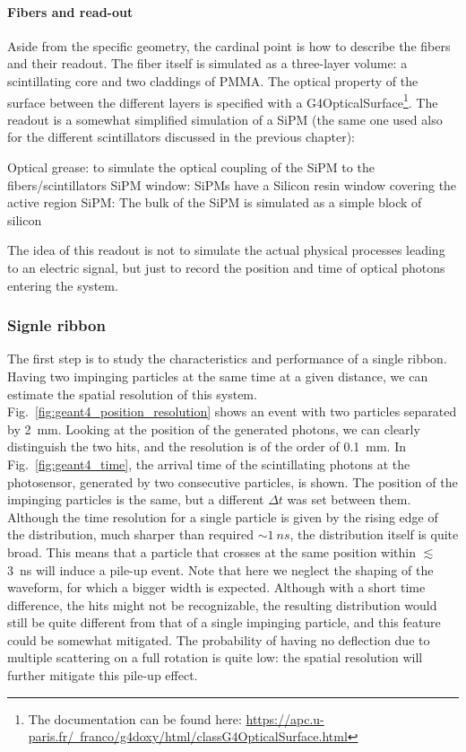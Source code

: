 \begin{refsection}
        \paragraph{Fibers and read-out} Aside from the specific geometry, the cardinal point is how to describe the fibers and their readout. 
        The fiber itself is simulated as a three-layer volume: a scintillating core and two claddings of PMMA.
        The optical property of the surface between the different layers is specified with a G4OpticalSurface\footnote{The documentation can be found here: \href{https://apc.u-paris.fr/~franco/g4doxy/html/classG4OpticalSurface.html}{https://apc.u-paris.fr/~franco/g4doxy/html/classG4OpticalSurface.html}}.
        The readout is a somewhat simplified simulation of a SiPM (the same one used also for the different scintillators discussed in the previous chapter):
        \begin{outline}
            \1 Optical grease: to simulate the optical coupling of the SiPM to the fibers/scintillators
            \1 SiPM window: SiPMs have a Silicon resin window covering the active region
            \1 SiPM: The bulk of the SiPM is simulated as a simple block of silicon
        \end{outline}
        The idea of this readout is not to simulate the actual physical processes leading to an electric signal, but just to record the position and time of optical photons entering the system.

        \subsubsection{Signle ribbon}
        The first step is to study the characteristics and performance of a single ribbon. Having two impinging particles at the same time at a given distance, we can estimate the spatial resolution of this system.  Fig.~\ref{fig:geant4_position_resolution} shows an event with two particles separated by \SI{2}{mm}. Looking at the position of the generated photons, we can clearly distinguish the two hits, and the resolution is of the order of \SI{0.1}{mm}.
        In Fig.~\ref{fig:geant4_time}, the arrival time of the scintillating photons at the photosensor, generated by two consecutive particles, is shown. 
        The position of the impinging particles is the same, but a different $\Delta t$ was set between them. 
        Although the time resolution for a single particle is given by the rising edge of the distribution, much sharper than required $\sim \SI{1}{ns}$, the distribution itself is quite broad. 
        This means that a particle that crosses at the same position within $\lesssim$ \SI{3}{ns} will induce a pile-up event. 
        Note that here we neglect the shaping of the waveform, for which a bigger width is expected. 
        Although with a short time difference, the hits might not be recognizable, the resulting distribution would still be quite different from that of a single impinging particle, and this feature could be somewhat mitigated. 
        The probability of having no deflection due to multiple scattering on a full rotation is quite low: the spatial resolution will further mitigate this pile-up effect. 
        

\end{refsection}
